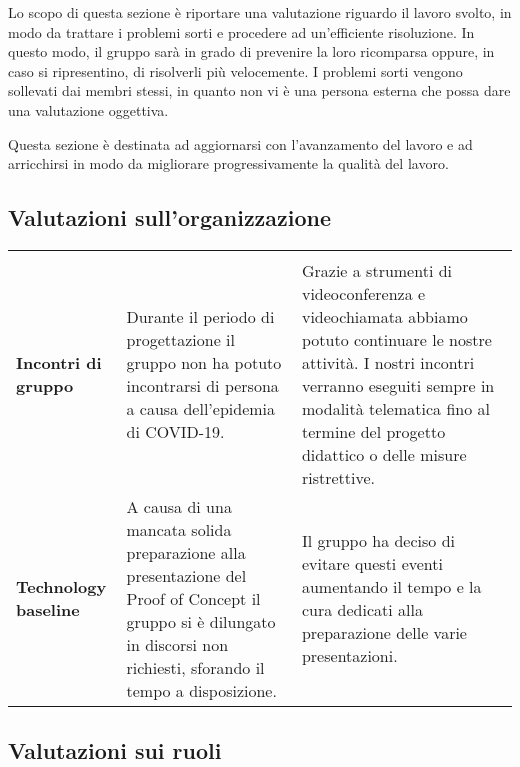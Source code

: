 \documentclass[../piano-di-qualifica.tex]{subfiles}
\begin{document}
  Lo scopo di questa sezione è riportare una valutazione riguardo il lavoro svolto, in modo da trattare
  i problemi sorti e procedere ad un'efficiente risoluzione.
  In questo modo, il gruppo sarà in grado di prevenire la loro ricomparsa oppure, in caso si ripresentino, di risolverli più velocemente.
  I problemi sorti vengono sollevati dai membri stessi, in quanto non vi è una
  persona esterna che possa dare una valutazione oggettiva.

  Questa sezione è destinata ad aggiornarsi con l'avanzamento del lavoro e ad arricchirsi in modo
  da migliorare progressivamente la qualità del lavoro.

  \subsection{Valutazioni sull'organizzazione}

  \begin{longtable}[H]{>{\centering\bfseries}m{4cm} >{\centering\arraybackslash}m{6cm} >{\centering\arraybackslash}m{6cm}}
    \rowcolor{darkgray!90!}
    \color{white}{\textbf{Dominio}} & \color{white}{\textbf{Problema}} & \color{white}{\textbf{Soluzione}} \\
    Incontri di gruppo & Durante il periodo di progettazione il gruppo non ha potuto incontrarsi di persona a causa dell'epidemia di COVID-19.  & Grazie a strumenti di videoconferenza e videochiamata abbiamo potuto continuare le nostre attività. I nostri incontri verranno eseguiti sempre in modalità telematica fino al termine del progetto didattico o delle misure ristrettive.\\
    Technology baseline & A causa di una mancata solida preparazione alla presentazione del Proof of Concept il gruppo si è dilungato in discorsi non richiesti, sforando il tempo a disposizione. & Il gruppo ha deciso di evitare questi eventi aumentando il tempo e la cura dedicati alla preparazione delle varie presentazioni. \\
  \end{longtable}


\newpage
  \subsection{Valutazioni sui ruoli}
\end{document}
